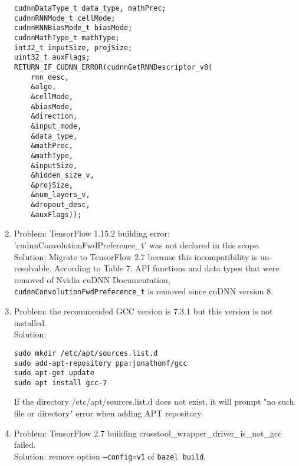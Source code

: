 \documentclass[a4paper]{article}
\begin{document}
\begin{enumerate}
    \begin{verbatim}
cudnnDataType_t data_type, mathPrec;
cudnnRNNMode_t cellMode;
cudnnRNNBiasMode_t biasMode;
cudnnMathType_t mathType;
int32_t inputSize, projSize;
uint32_t auxFlags;
RETURN_IF_CUDNN_ERROR(cudnnGetRNNDescriptor_v8(
    rnn_desc,
    &algo,
    &cellMode,
    &biasMode,
    &direction,
    &input_mode,
    &data_type,
    &mathPrec,
    &mathType,
    &inputSize,
    &hidden_size_v,
    &projSize,
    &num_layers_v,
    &dropout_desc,
    &auxFlags));
    \end{verbatim}
    \item Problem: TensorFlow 1.15.2 building error: 'cudnnConvolutionFwdPreference\_t' was not declared in this scope.\\
    Solution: Migrate to TensorFlow 2.7 because this incompatibility is un-resolvable. According to Table 7. API functions and data types that were removed of Nvidia cuDNN Documentation, \texttt{cudnnConvolutionFwdPreference\_t} is removed since cuDNN version 8.
    \item Problem: the recommended GCC version is 7.3.1 but this version is not installed.\\
    Solution:
    \begin{verbatim}
sudo mkdir /etc/apt/sources.list.d
sudo add-apt-repository ppa:jonathonf/gcc
sudo apt-get update
sudo apt install gcc-7
    \end{verbatim}
    If the directory /etc/apt/sources.list.d does not exist, it will prompt "no such file or directory" error when adding APT repository.
    \item Problem: TensorFlow 2.7 building crosstool\_wrapper\_driver\_is\_not\_gcc failed.\\
    Solution: remove option \texttt{--config=v1} of \texttt{bazel build}.
\end{enumerate}
\end{document}

